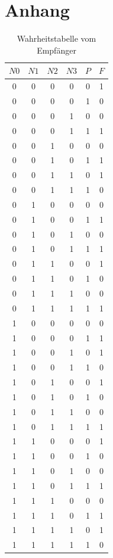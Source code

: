 \documentclass{article}
\begin{document}
\newpage
\section[Anhang]{Anhang}
\label{sec:anhang}
\begin{table}[h]
  \begin{center}
\begin{tabular}{c|c|c|c|c|c}
  $N0$ & $N1$ & $N2$ & $N3$ & $P$ & $F$ \\
  \hline
  0 & 0 & 0 & 0 & 0 & 1\\
  0 & 0 & 0 & 0 & 1 & 0\\
  0 & 0 & 0 & 1 & 0 & 0\\
  0 & 0 & 0 & 1 & 1 & 1\\
  0 & 0 & 1 & 0 & 0 & 0\\
  0 & 0 & 1 & 0 & 1 & 1\\
  0 & 0 & 1 & 1 & 0 & 1\\
  0 & 0 & 1 & 1 & 1 & 0\\
  0 & 1 & 0 & 0 & 0 & 0\\
  0 & 1 & 0 & 0 & 1 & 1\\
  0 & 1 & 0 & 1 & 0 & 0\\
  0 & 1 & 0 & 1 & 1 & 1\\
  0 & 1 & 1 & 0 & 0 & 1\\
  0 & 1 & 1 & 0 & 1 & 0\\
  0 & 1 & 1 & 1 & 0 & 0\\
  0 & 1 & 1 & 1 & 1 & 1\\
  1 & 0 & 0 & 0 & 0 & 0\\
  1 & 0 & 0 & 0 & 1 & 1\\
  1 & 0 & 0 & 1 & 0 & 1\\
  1 & 0 & 0 & 1 & 1 & 0\\
  1 & 0 & 1 & 0 & 0 & 1\\
  1 & 0 & 1 & 0 & 1 & 0\\
  1 & 0 & 1 & 1 & 0 & 0\\
  1 & 0 & 1 & 1 & 1 & 1\\
  1 & 1 & 0 & 0 & 0 & 1\\
  1 & 1 & 0 & 0 & 1 & 0\\
  1 & 1 & 0 & 1 & 0 & 0\\
  1 & 1 & 0 & 1 & 1 & 1\\
  1 & 1 & 1 & 0 & 0 & 0\\
  1 & 1 & 1 & 0 & 1 & 1\\
  1 & 1 & 1 & 1 & 0 & 1\\
  1 & 1 & 1 & 1 & 1 & 0\\
\end{tabular}
\caption{Wahrheitstabelle vom Empfänger}
\end{center}
\end{table}
\end{document}
